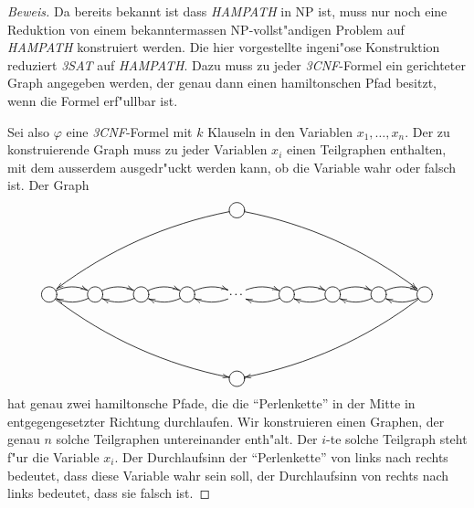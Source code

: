 \begin{proof}[Beweis]
Da bereits bekannt ist dass \textsl{HAMPATH} in NP ist, muss nur
noch eine Reduktion von einem bekanntermassen NP-vollst"andigen
Problem auf \textsl{HAMPATH} konstruiert werden. Die hier vorgestellte
ingeni"ose Konstruktion reduziert \textsl{3SAT} auf \textsl{HAMPATH}.
Dazu muss zu jeder \textsl{3CNF}-Formel ein gerichteter Graph angegeben
werden, der genau dann einen hamiltonschen Pfad besitzt, wenn die
Formel erf"ullbar ist.

Sei also $\varphi$ eine \textsl{3CNF}-Formel mit $k$ Klauseln in den Variablen
$x_1,\dots,x_n$. Der zu konstruierende Graph muss zu jeder Variablen
$x_i$ einen Teilgraphen enthalten, mit dem ausserdem ausgedr"uckt
werden kann, ob die Variable wahr oder falsch ist. Der Graph
\[
\entrymodifiers={++[o][F]}
\xymatrix{
*+\txt{}
	&*+\txt{}
		&*+\txt{}
			&*+\txt{}
				&{} \ar@/_10pt/[ddllll]\ar@/^10pt/[ddrrrr]
					&*+\txt{}
						&*+\txt{}
							&*+\txt{}
								&*+\txt{}
\\
*+\txt{}
\\
{}\ar@/^/[r] \ar@/_10pt/[ddrrrr]
	&{}\ar@/^/[r] \ar@/^/[l]
		&{}\ar@/^/[r] \ar@/^/[l]
			&{}\ar@/^/[r] \ar@/^/[l]
				&*+\txt{\dots}\ar@/^/[r] \ar@/^/[l]
					&{}\ar@/^/[r] \ar@/^/[l]
						&{}\ar@/^/[r] \ar@/^/[l]
							&{}\ar@/^/[r] \ar@/^/[l]
								&{} \ar@/^/[l]\ar@/^10pt/[ddllll]
\\	
*+\txt{}
\\
*+\txt{}
	&*+\txt{}
		&*+\txt{}
			&*+\txt{}
				&{}
					&*+\txt{}
						&*+\txt{}
							&*+\txt{}
								&*+\txt{}
}
\]
hat genau zwei hamiltonsche Pfade, die die ``Perlenkette'' in der
Mitte in entgegengesetzter Richtung durchlaufen.
Wir konstruieren einen Graphen, der
genau $n$ solche Teilgraphen untereinander enth"alt. Der $i$-te solche
Teilgraph steht f"ur die Variable $x_i$. Der Durchlaufsinn der ``Perlenkette''
von links nach rechts bedeutet, dass diese Variable wahr sein soll,
der Durchlaufsinn von rechts nach links bedeutet, dass sie falsch ist.


\end{proof}
